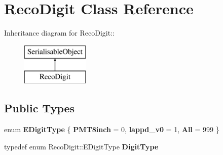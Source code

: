 \hypertarget{classRecoDigit}{
\section{RecoDigit Class Reference}
\label{classRecoDigit}
}
Inheritance diagram for RecoDigit::\begin{figure}[H]
\begin{center}
\leavevmode
\includegraphics[height=2cm]{classRecoDigit}
\end{center}
\end{figure}
\subsection*{Public Types}
\begin{DoxyCompactItemize}
\item 
enum {\bfseries EDigitType} \{ {\bfseries PMT8inch} =  0, 
{\bfseries lappd\_\-v0} =  1, 
{\bfseries All} =  999
 \}
\item 
\hypertarget{classRecoDigit_a956555c09334bd9113b3928a64a24e78}{
typedef enum RecoDigit::EDigitType {\bfseries DigitType}}
\label{classRecoDigit_a956555c09334bd9113b3928a64a24e78}

\end{DoxyCompactItemize}
